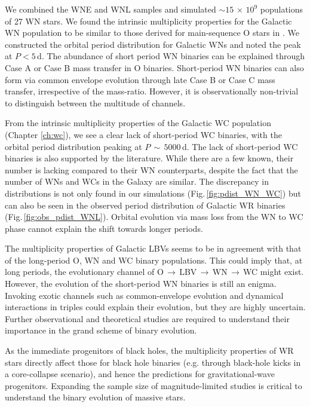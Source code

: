We combined the WNE and WNL samples and simulated ${\sim}15\,\times\,10^9$ populations of 27 WN stars. We found the intrinsic multiplicity properties for the Galactic WN population to be similar to those derived for main-sequence O stars in \citet{sana_binary_2012}. We constructed the orbital period distribution for Galactic WNs and noted the peak at $P<5\,$d. The abundance of short period WN binaries can be explained through Case A or Case B mass transfer in O binaries. Short-period WN binaries can also form via common envelope evolution through late Case B or Case C mass transfer, irrespective of the mass-ratio. However, it is observationally non-trivial to distinguish between the multitude of channels.

From the intrinsic multiplicity properties of the Galactic WC population (Chapter \ref{ch:wc}), we see a clear lack of short-period WC binaries, with the orbital period distribution peaking at $P\,{\sim}\,5000\,$d. The lack of short-period WC binaries is also supported by the literature. While there are a few known, their number is lacking compared to their WN counterparts, despite the fact that the number of WNs and WCs in the Galaxy are similar. The discrepancy in distributions is not only found in our simulations (Fig.\,\ref{fig:pdist_WN_WC}) but can also be seen in the observed period distribution of Galactic WR binaries (Fig.\,\ref{fig:obs_pdist_WNL}). Orbital evolution via mass loss from the WN to WC phase cannot explain the shift towards longer periods.

The multiplicity properties of Galactic LBVs \citep{mahy_multiplicity_2022} seems to be in agreement with that of the long-period O, WN and WC binary populations. This could imply that, at long periods, the evolutionary channel of O$\,\xrightarrow{}$\,LBV\,$\xrightarrow{}$\,WN\,$\xrightarrow{}$\,WC might exist. However, the evolution of the short-period WN binaries is still an enigma. Invoking exotic channels such as common-envelope evolution and dynamical interactions in triples could explain their evolution, but they are highly uncertain. Further observational and theoretical studies are required to understand their importance in the grand scheme of binary evolution.

As the immediate progenitors of black holes, the multiplicity properties of WR stars directly affect those for black hole binaries (e.g. through black-hole kicks in a core-collapse scenario), and hence the predictions for gravitational-wave progenitors. Expanding the sample size of magnitude-limited studies is critical to understand the binary evolution of massive stars.
